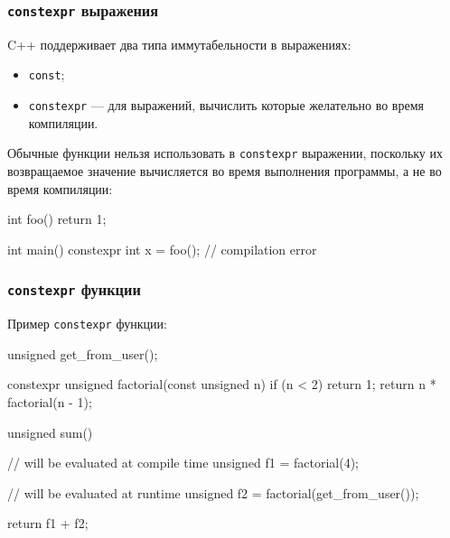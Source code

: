 \documentclass[compress, 8pt, aspectratio=169]{beamer}
\begin{document}
\begin{frame}[fragile]

    \frametitle{\texttt{constexpr} выражения}

    C++ поддерживает два типа иммутабельности в выражениях:

    \begin{itemize}
        \item \verb|const|;
        \item \verb|constexpr|\footnotemark{} --- для выражений, вычислить которые
            желательно во время компиляции.
    \end{itemize}


    \hfill\break
    Обычные функции нельзя использовать в \verb|constexpr| выражении, поскольку
    их возвращаемое значение вычисляется во время выполнения программы, а не во время
    компиляции:

    \begin{myinplacelisting}[minted language=cpp]
int foo() { return 1; }

int main() {
    constexpr int x = foo(); // compilation error
}
    \end{myinplacelisting}

\end{frame}

\begin{frame}[fragile]

    \frametitle{\texttt{constexpr} функции}

    Пример \verb|constexpr| функции:

    \begin{myinplacelisting}[minted language=cpp]
unsigned get_from_user();

constexpr unsigned factorial(const unsigned n) {
    if (n < 2) {
        return 1;
    }
    return n * factorial(n - 1);
}

unsigned sum() {
    // will be evaluated at compile time
    unsigned f1 = factorial(4);

    // will be evaluated at runtime
    unsigned f2 = factorial(get_from_user());

    return f1 + f2;
}
    \end{myinplacelisting}

\end{frame}
\end{document}
